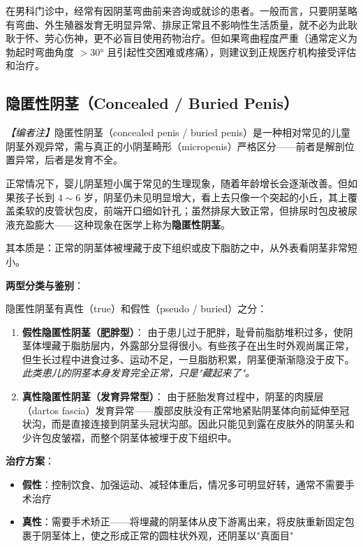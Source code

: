 \begin{tcolorbox}[colback=pink!5!white,colframe=red!50!black,title=贴心小叮咛]
在男科门诊中，经常有因阴茎弯曲前来咨询或就诊的患者。一般而言，只要阴茎略有弯曲、外生殖器发育无明显异常、排尿正常且不影响性生活质量，就不必为此耿耿于怀、劳心伤神，更不必盲目使用药物治疗。但如果弯曲程度严重（通常定义为勃起时弯曲角度 $> 30°$ 且引起性交困难或疼痛），则建议到正规医疗机构接受评估和治疗。
\end{tcolorbox}

\subsection{隐匿性阴茎（Concealed / Buried Penis）}

\noindent\textit{【编者注】}隐匿性阴茎（concealed penis / buried penis）是一种相对常见的儿童阴茎外观异常，需与真正的小阴茎畸形（micropenis）严格区分——前者是解剖位置异常，后者是发育不全。

\vspace{0.5em}
正常情况下，婴儿阴茎短小属于常见的生理现象，随着年龄增长会逐渐改善。但如果孩子长到 $4\sim6$ 岁，阴茎仍未见明显增大，看上去只像一个突起的小丘，其上覆盖柔软的皮管状包皮，前端开口细如针孔；虽然排尿大致正常，但排尿时包皮被尿液充盈膨大——这种现象在医学上称为\textbf{隐匿性阴茎}。

其本质是：正常的阴茎体被埋藏于皮下组织或皮下脂肪之中，从外表看阴茎非常短小。

\vspace{0.5em}
\noindent\textbf{两型分类与鉴别}：

隐匿性阴茎有真性（true）和假性（pseudo / buried）之分：

\begin{enumerate}
	\item \textbf{假性隐匿性阴茎（肥胖型）}：
	由于患儿过于肥胖，耻骨前脂肪堆积过多，使阴茎体埋藏于脂肪层内，外露部分显得很小。有些孩子在出生时外观尚属正常，但生长过程中进食过多、运动不足，一旦脂肪积累，阴茎便渐渐隐没于皮下。\textit{此类患儿的阴茎本身发育完全正常，只是"藏起来了"。}

	\item \textbf{真性隐匿性阴茎（发育异常型）}：
	由于胚胎发育过程中，阴茎的肉膜层（dartos fascia）发育异常——腹部皮肤没有正常地紧贴阴茎体向前延伸至冠状沟，而是直接连接到阴茎头冠状沟部。因此只能见到露在皮肤外的阴茎头和少许包皮皱褶，而整个阴茎体被埋于皮下组织中。
\end{enumerate}

\noindent\textbf{治疗方案}：

\begin{itemize}
	\item \textbf{假性}：控制饮食、加强运动、减轻体重后，情况多可明显好转，通常不需要手术治疗
	\item \textbf{真性}：需要手术矫正——将埋藏的阴茎体从皮下游离出来，将皮肤重新固定包裹于阴茎体上，使之形成正常的圆柱状外观，还阴茎以"真面目"
\end{itemize}

